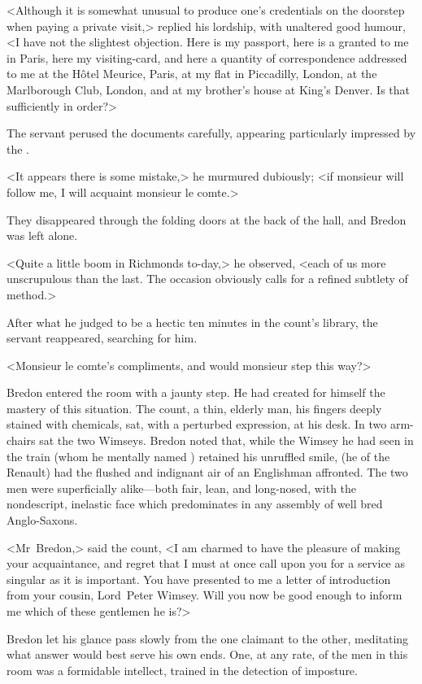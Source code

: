 <Although it is somewhat unusual to produce one's credentials on the doorstep when paying a private visit,> replied his lordship, with unaltered good humour, <I have not the slightest objection. Here is my passport, here is a  granted to me in Paris, here my visiting-card, and here a quantity of correspondence addressed to me at the Hôtel Meurice, Paris, at my flat in Piccadilly, London, at the Marlborough Club, London, and at my brother's house at King's Denver. Is that sufficiently in order?>

The servant perused the documents carefully, appearing particularly impressed by the .

<It appears there is some mistake,> he murmured dubiously; <if monsieur will follow me, I will acquaint monsieur le comte.>

They disappeared through the folding doors at the back of the hall, and Bredon was left alone.

<Quite a little boom in Richmonds to-day,> he observed, <each of us more unscrupulous than the last. The occasion obviously calls for a refined subtlety of method.>

After what he judged to be a hectic ten minutes in the count's library, the servant reappeared, searching for him.

<Monsieur le comte's compliments, and would monsieur step this way?>

Bredon entered the room with a jaunty step. He had created for himself the mastery of this situation. The count, a thin, elderly man, his fingers deeply stained with chemicals, sat, with a perturbed expression, at his desk. In two arm-chairs sat the two Wimseys. Bredon noted that, while the Wimsey he had seen in the train (whom he mentally named ) retained his unruffled smile,  (he of the Renault) had the flushed and indignant air of an Englishman affronted. The two men were superficially alike—both fair, lean, and long-nosed, with the nondescript, inelastic face which predominates in any assembly of well bred Anglo-Saxons.

<Mr~Bredon,> said the count, <I am charmed to have the pleasure of making your acquaintance, and regret that I must at once call upon you for a service as singular as it is important. You have presented to me a letter of introduction from your cousin, Lord~Peter Wimsey. Will you now be good enough to inform me which of these gentlemen he is?>

Bredon let his glance pass slowly from the one claimant to the other, meditating what answer would best serve his own ends. One, at any rate, of the men in this room was a formidable intellect, trained in the detection of imposture.

